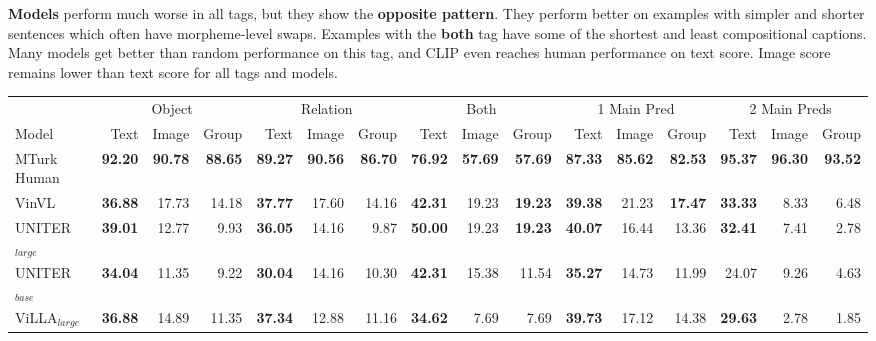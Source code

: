 \textbf{Models} perform much worse in all tags, but they show the \textbf{opposite pattern}. They perform better on examples with simpler and shorter sentences which often have morpheme-level swaps. Examples with the \textbf{both} tag have some of the shortest and least compositional captions. Many models get better than random performance on this tag, and CLIP even reaches human performance on text score. Image score remains lower than text score for all tags and models.

\begin{table}[ht]
    \centering
    \begin{adjustbox}{max width=\textwidth}
  \begin{tabular}{l|rrr|rrr|rrr|rrr|rrr}
    \toprule
     &
      \multicolumn{3}{c|}{Object} &
      \multicolumn{3}{c|}{Relation} &
      \multicolumn{3}{c|}{Both} &
      \multicolumn{3}{c|}{1 Main Pred} &
      \multicolumn{3}{c}{2 Main Preds}\\
    Model & Text & Image & Group & Text & Image & Group & Text & Image & Group & Text & Image & Group & Text & Image & Group \\\midrule
 MTurk Human                  & \textbf{92.20} & \textbf{90.78} & \textbf{88.65} & \textbf{89.27} & \textbf{90.56} & \textbf{86.70} & \textbf{76.92} & \textbf{57.69} & \textbf{57.69} & \textbf{87.33} & \textbf{85.62} & \textbf{82.53} & \textbf{95.37} & \textbf{96.30} & \textbf{93.52} \\
 VinVL                        & \textbf{36.88} & 17.73          & 14.18          & \textbf{37.77} & 17.60          & 14.16          & \textbf{42.31} & 19.23          & \textbf{19.23} & \textbf{39.38} & 21.23          & \textbf{17.47} & \textbf{33.33} & 8.33           & 6.48           \\
 UNITER$_{large}$             & \textbf{39.01} & 12.77          & 9.93           & \textbf{36.05} & 14.16          & 9.87           & \textbf{50.00} & 19.23          & \textbf{19.23} & \textbf{40.07} & 16.44          & 13.36          & \textbf{32.41} & 7.41           & 2.78           \\
 UNITER$_{base}$              & \textbf{34.04} & 11.35          & 9.22           & \textbf{30.04} & 14.16          & 10.30          & \textbf{42.31} & 15.38          & 11.54          & \textbf{35.27} & 14.73          & 11.99          & 24.07          & 9.26           & 4.63           \\
 ViLLA$_{large}$              & \textbf{36.88} & 14.89          & 11.35          & \textbf{37.34} & 12.88          & 11.16          & \textbf{34.62} & 7.69           & 7.69           & \textbf{39.73} & 17.12          & 14.38          & \textbf{29.63} & 2.78           & 1.85           \\

\end{tabular}
\end{adjustbox}
\end{table}
